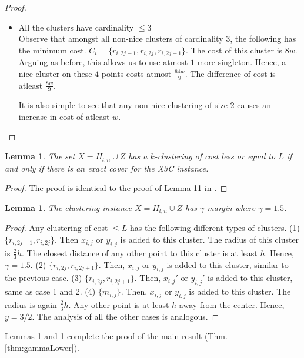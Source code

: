 \documentclass{article}
\newtheorem{lemma}[theorem]{Lemma}
\begin{document}
\begin{proof}
\begin{itemize}[nolistsep,leftmargin=*]
\item All the clusters have cardinality $\le 3$ \\
Observe that amongst all non-nice clusters of cardinality $3$, the following has the minimum cost. $C_i = \{r_{i, 2j-1}, r_{i, 2j}, r_{i, 2j+1}\}$. The cost of this cluster is $8w$. Arguing as before, this allows us to use atmost $1$ more singleton. Hence, a nice cluster on these $4$ points costs atmost $\frac{64w}{9}$. The difference of cost is atleast $\frac{8w}{9}$.

It is also simple to see that any non-nice clustering of size $2$ causes an increase in cost of atleast $w$.

\end{itemize}
\end{proof}

\begin{lemma}
\label{lemma:kmeansEquivalenceX3C}
The set $X = H_{l,n} \cup Z$ has a $k$-clustering of cost less or equal to $L$ if and only if there is an exact cover for the X3C instance.
\end{lemma}
\begin{proof}
The proof is identical to the proof of Lemma 11 in \cite{vattani2009hardness}.
\end{proof}

\begin{lemma}
\label{lemma:gammaLower}
The clustering instance $X = H_{l,n} \cup Z$ has $\gamma$-margin where $\gamma = 1.5$.
\end{lemma}
\begin{proof}
Any clustering of cost $\le L$ has the following different types of clusters. (1) $\{r_{i,2j-1}, r_{i, 2j}\}$. Then $x_{i,j}$ or $y_{i,j}$ is added to this cluster. The radius of this cluster is $\frac{2}{3}h$. The closest distance of any other point to this cluster is at least $h$. Hence, $\gamma = 1.5$. (2) $\{r_{i,2j}, r_{i, 2j+1}\}$. Then, $x_{i,j}$ or $y_{i,j}$ is added to this cluster, similar to the previous case. 
(3) $\{r_{i,2j}, r_{i, 2j+1}\}$. Then, $x_{i,j}'$ or $y_{i,j}'$ is added to this cluster, same as case 1 and 2. (4) $\{m_{i,j}\}$. Then, $x_{i,j}$ or $y_{i,j}$ is added to this cluster. The radius is again $\frac{2}{3}h$. Any other point is at least $h$ away from the center. Hence, $y= 3/2$. The analysis of all the other cases is analogous.
\end{proof}
Lemmas \ref{lemma:kmeansEquivalenceX3C} and \ref{lemma:gammaLower} complete the proof of the main result (Thm. \ref{thm:gammaLower}). 
\end{document}
